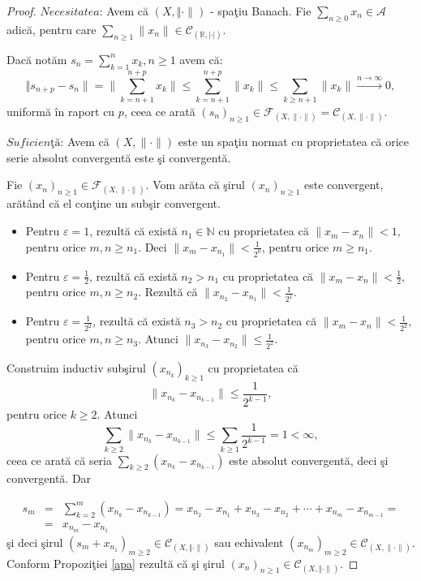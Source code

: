 \documentclass[ a4paper, 12pt]{report}
\theoremstyle{definition}
\theoremstyle{remark}
\numberwithin{equation}{section}
\begin{document}
\begin{proof}
$\textit{Necesitatea:}$
Avem c\u a  $(X, \Vert \cdot \rVert)$ - spa\c tiu Banach. Fie $\sum\limits_{n \geq 0} x_n \in \mathcal{A}$ adic\u a, pentru care $\sum\limits_{n \geq 1} \lVert x_n \rVert \in \mathcal{C}_{(\mathbb{R},\lvert \cdot \rvert)}$.

Dac\u a not\u am $s_n = \sum\limits_{k=1}^{n} x_k, n \geq 1$ avem c\u a:
$$ \Vert s_{n+p} - s_n \rVert =\lVert \sum\limits_{k=n+1}^{n+p} x_k \rVert
\leq  \sum\limits_{k=n+1}^{n+p} \lVert x_k \rVert \leq \sum\limits_{k \geq n+1} \lVert x_k \rVert \stackrel{n \rightarrow \infty}{\longrightarrow}0,$$ uniform\u a \^in raport cu $p$, ceea ce arat\u a $(s_n)_{n \geq 1} \in \mathcal{F}_{(X,\lVert \cdot \rVert)} = \mathcal{C}_{(X, \lVert  \cdot\rVert)}.$

$\textit{Suficien\c t\u a:}$ Avem c\u a $(X,\lVert \cdot \rVert)$ este un spa\c tiu normat cu proprietatea c\u a  orice serie absolut convergent\u a este \c si convergent\u a.

Fie $(x_n)_{n \geq 1} \in \mathcal{F}_{(X, \lVert \cdot \rVert)}.$ Vom ar\u ata c\u a \c sirul $(x_n)_{n \geq 1}$ este convergent, ar\u at\^and c\u a el con\c tine un sub\c sir convergent.
\begin{itemize}
\item Pentru $\varepsilon\!=\!1$, rezult\u a c\u a exist\u a $n_1 \in \mathbb{N}$ cu proprietatea c\u a $\lVert x_m - x_n \rVert < 1,$ pentru orice $m,n \geq n_1$. Deci $\lVert x_m-x_{n_1}\rVert<\frac{1}{2^0}$, pentru orice  $m \geq n_1$.
\item Pentru $\varepsilon\!\!=\!\!\frac{1}{2}$,  rezult\u a c\u a exist\u a $n_2 > n_1$ cu proprietatea c\u a $\lVert x_m - x_n \rVert < \frac{1}{2}$, pentru orice $m,n \geq n_2$. Rezult\u a c\u  a $\lVert x_{n_2}-x_{n_1}\rVert<\frac{1}{2^1}$.
\item Pentru $\varepsilon\!\!=\!\!\frac{1}{2^2}$,  rezult\u a c\u a exist\u a $n_3\!\!>\!\!n_2$ cu proprietatea c\u a $\lVert x_m - x_n \rVert < \frac{1}{2^2},$ pentru orice $m,n \geq n_3$. Atunci $\lVert x_{n_3}-x_{n_2}\rVert \leq \frac{1}{2^2}$.
\end{itemize}
Construim inductiv sub\c sirul $(x_{n_k})_{k \geq 1}$ cu proprietatea c\u a
$$ \lVert x_{n_k} - x_{n_{k-1}} \rVert \leq \frac{1}{2^{k-1}},$$ pentru orice $k \geq 2$. Atunci
$$\sum\limits_{k \geq 2} \lVert x_{n_k} - x_{n_{k-1}} \rVert \leq \sum\limits_{k \geq 1}\frac{1}{2^{k-1}} = 1 < \infty,$$ ceea ce arat\u a c\u a seria
$\sum\limits_{k \geq 2} (x_{n_k} - x_{n_{k-1}})$ este absolut convergent\u a, deci \c si convergent\u a. Dar

\begin{eqnarray*}
s_m &=& \sum\limits_{k=2}^{m}(x_{n_k}-x_{n_{k-1}}) = x_{n_2}-x_{n_1}+x_{n_3}-x_{n_2}+ \cdots+x_{n_m}-x_{n_{m-1}}= \\
&=&x_{n_m}-x_{n_1}
\end{eqnarray*}
\c si deci \c sirul
$(s_m + x_{n_1})_{m \geq 2} \in \mathcal{C}_{(X, \Vert \cdot \rVert)}$ sau echivalent  $(x_{n_m})_{m \geq 2} \in \mathcal{C}_{(X, \lVert \cdot \rVert)}$. Conform Propozi\c tiei \ref{apa} rezult\u a c\u a \c si \c sirul  $(x_n)_{n \geq 1} \in \mathcal{C}_{(X, \Vert \cdot \rVert)}$.
\end{proof}
\end{document}

